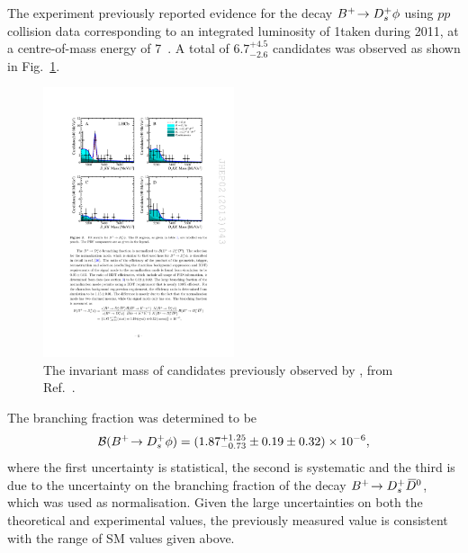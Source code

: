 The \lhcb experiment previously reported evidence for the decay ${{{B}^+}}\!\rightarrow {\ensuremath{{D}^+_{s}}}\phi$ using $pp$ collision data corresponding to an integrated luminosity of 1\invfb taken during 2011, at a centre-of-mass energy of 7\tev~\cite{Aaij:2012zh}. A total of $6.7^{+4.5}_{-2.6}$ candidates was observed as shown in Fig.~\ref{fig:Theory_prev_B2DsPhi}. 
\begin{figure}[!h]
    \centering
    \includegraphics[width=0.5\textwidth]{figs/Theory/Prev_B2DsPhi.pdf}
    \caption{The invariant mass of \decay{\Bp}{\Dsp\phiz} candidates previously observed by \lhcb, from Ref.~\cite{Aaij:2012zh}. }
    \label{fig:Theory_prev_B2DsPhi}   
\end{figure}
The branching fraction was determined to be 
\begin{equation}
\mathcal{B}({{{B}^+}}\!\rightarrow {\ensuremath{{D}^+_{s}}}\phi) = (1.87^{+1.25}_{-0.73} \pm 0.19 \pm 0.32) \times 10^{-6},
\end{equation}
where the first uncertainty is statistical, the second is systematic and the third is due to the uncertainty on the branching fraction of the decay ${{{B}^+}}\!\rightarrow {\ensuremath{{D}^+_{s}}}{\ensuremath{{\kern 0.2em\overline{\kern -0.2em D}{}}{}^0}}$, which was used as normalisation. 
Given the large uncertainties on both the theoretical and experimental values, the previously measured value is consistent with the range of SM values given above.





